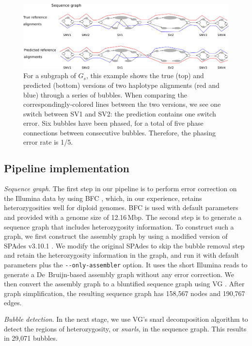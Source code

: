 \begin{figure}[t!]\centering
\includegraphics[width=\columnwidth]{evaluation.pdf}
\caption{For a subgraph of $G_s$, this example shows the true (top) and predicted (bottom) versions of two haplotype alignments (red and blue) through a series of bubbles. When comparing the correspondingly-colored lines between the two versions, we see one switch between SV1 and SV2: the prediction contains one switch error. 
Six bubbles have been phased, for a total of five phase connections between consecutive bubbles. Therefore, the phasing error rate is 1/5.}
\label{fig:evaluation}
\end{figure}

\subsection{Pipeline implementation}
\textit{Sequence graph}.
The first step in our pipeline is to perform error correction on the Illumina data by using BFC \citep{li2015bfc}, which, in our experience, retains heterozygosities well for diploid genomes.
BFC is used with default parameters and provided with a genome size of 12.16\,Mbp.
The second step is to generate a sequence graph that includes heterozygosity information.
To construct such a graph, we first construct the assembly graph by using a modified version of SPAdes v3.10.1 \citep{bankevich2012spades}.
We modify the original SPAdes to skip the bubble removal step and retain the heterozygosity information in the graph, and run it with default parameters plus the \texttt{{-}{-}only-assembler} option.
It uses the short Illumina reads to generate a De~Bruijn-based assembly graph without any error correction.
We then convert the assembly graph to a bluntified sequence graph using VG \citep{garrison2017sequence}.
After graph simplification, the resulting sequence graph has 158,567 nodes and 190,767 edges.

\textit{Bubble detection}. In the next stage, we use VG's snarl decomposition algorithm \citep{paten2017superbubbles} to detect the regions of heterozygosity, or \textit{snarls}, in the sequence graph. This results in 29,071 bubbles.

